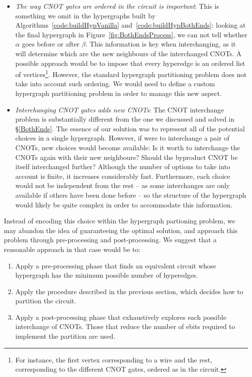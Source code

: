\begin{itemize}
  \item \textit{The way CNOT gates are ordered in the circuit is important}: This is something we omit in the hypergraphs built by Algorithms~\ref{code:buildHypVanilla} and~\ref{code:buildHypBothEnds}: looking at the final hypergraph in Figure~\ref{fig:BothEndsProcess}, we can not tell whether \(\alpha\) goes before or after \(\beta\). This information is key when interchanging, as it will determine which are the new neighbours of the interchanged CNOTs. A possible approach would be to impose that every hyperedge is an ordered list of vertices\footnote{For instance, the first vertex corresponding to a wire and the rest, corresponding to the different CNOT gates, ordered as in the circuit.}. However, the standard hypergraph partitioning problem does not take into account such ordering. We would need to define a custom hypergraph partitioning problem in order to manage this new aspect.

  \item \textit{Interchanging CNOT gates adds new CNOTs}: The CNOT interchange problem is substantially different from the one we discussed and solved in \S\ref{BothEnds}. The essence of our solution was to represent all of the potential choices in a single hypergraph. However, if were to interchange a pair of CNOTs, new choices would become available: Is it worth to interchange the CNOTs again with their new neighbours? Should the byproduct CNOT be itself interchanged further? Although the number of options to take into account is finite, it increases considerably fast. Furthermore, each choice would not be independent from the rest -- as some interchanges are only available if others have been done before -- so the structure of the hypergraph would likely be quite complex in order to accommodate this information.
\end{itemize}

Instead of encoding this choice within the hypergraph partioning problem, we may abandon the idea of guaranteeing the optimal solution, and approach this problem through pre-processing and post-processing. We suggest that a reasonable approach in that case would be to:
\begin{enumerate} 
\item Apply a pre-processing phase that finds an equivalent circuit whose hypergraph has the minimum possible number of hyperedges. 
\item Apply the procedure described in the previous section, which decides how to partition the circuit. 
\item Apply a post-processing phase that exhaustively explores each possible interchange of CNOTs. Those that reduce the number of ebits required to implement the partition are used.
\end{enumerate}


